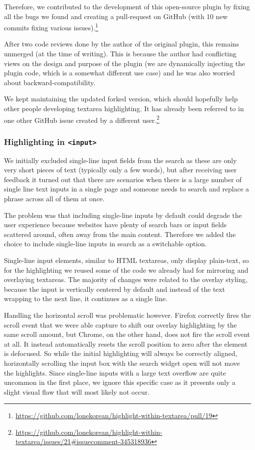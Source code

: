 \documentclass[bsc,frontabs,twoside,singlespacing,parskip,deptreport]{infthesis}
\begin{document}
Therefore, we contributed to the development of this open-source plugin by fixing all the bugs we found and creating a pull-request on GitHub (with 10 new commits fixing various issues).\footnote{\url{https://github.com/lonekorean/highlight-within-textarea/pull/19}}

After two code reviews done by the author of the original plugin, this remains unmerged (at the time of writing). This is because the author had conflicting views on the design and purpose of the plugin (we are dynamically injecting the plugin code, which is a somewhat different use case) and he was also worried about backward-compatibility. 

We kept maintaining the updated forked version, which should hopefully help other people developing textarea highlighting. It has already been referred to in one other GitHub issue created by a different user.\footnote{\url{https://github.com/lonekorean/highlight-within-textarea/issues/21\#issuecomment-345318936}}

\subsubsection{Highlighting in \texttt{\textless{}input\textgreater{}}}
We initially excluded single-line input fields from the search as these are only very short pieces of text (typically only a few words), but after receiving user feedback it turned out that there are scenarios when there is a large number of single line text inputs in a single page and someone needs to search and replace a phrase across all of them at once.

The problem was that including single-line inputs by default could degrade the user experience because websites have plenty of search bars or input fields scattered around, often away from the main content. Therefore we added the choice to include single-line inputs in search as a switchable option.

Single-line input elements, similar to HTML textareas, only display plain-text, so for the highlighting we reused some of the code we already had for mirroring and overlaying textareas. The majority of changes were related to the overlay styling, because the input is vertically centered by default and instead of the text wrapping to the next line, it continues as a single line.

Handling the horizontal scroll was problematic however. Firefox correctly fires the scroll event that we were able capture to shift our overlay highlighting by the same scroll amount, but Chrome, on the other hand, does not fire the scroll event at all. It instead automatically resets the scroll position to zero after the element is defocused. So while the initial highlighting will always be correctly aligned, horizontally scrolling the input box with the search widget open will not move the highlights. Since single-line inputs with a large text overflow are quite uncommon in the first place, we ignore this specific case as it presents only a slight visual flaw that will most likely not occur.
\end{document}
